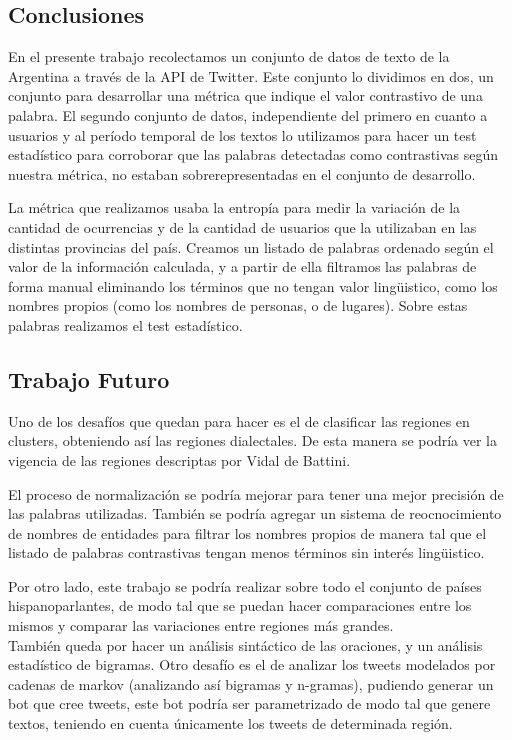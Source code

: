 
\subsection{Conclusiones}
En el presente trabajo recolectamos un conjunto de datos de texto de la Argentina a través de la API de Twitter. Este conjunto lo dividimos en dos, un conjunto para desarrollar una métrica que indique el valor contrastivo de una palabra. El segundo conjunto de datos, independiente del primero en cuanto a usuarios y al período temporal de los textos lo utilizamos para hacer un test estadístico para corroborar que las palabras detectadas como contrastivas según nuestra métrica, no estaban sobrerepresentadas en el conjunto de desarrollo.

La métrica que realizamos usaba la entropía para medir la variación de la cantidad de ocurrencias y de la cantidad de usuarios que la utilizaban en las distintas provincias del país. Creamos un listado de palabras ordenado según el valor de la información calculada, y a partir de ella filtramos las palabras de forma manual eliminando los términos que no tengan valor lingüistico, como los nombres propios (como los nombres de personas, o de lugares). Sobre estas palabras realizamos el test estadístico. 

\subsection{Trabajo Futuro}

Uno de los desafíos que quedan para hacer es el de clasificar las regiones en clusters, obteniendo así las regiones dialectales. De esta manera se podría ver la vigencia de las regiones descriptas por Vidal de Battini. %

El proceso de normalización se podría mejorar para tener una mejor precisión de las palabras utilizadas. También se podría agregar un sistema de reocnocimiento de nombres de entidades para filtrar los nombres propios de manera tal que el listado de palabras contrastivas tengan menos términos sin interés lingüistico.

Por otro lado, este trabajo se podría realizar sobre todo el conjunto de países hispanoparlantes, de modo tal que se puedan hacer comparaciones entre los mismos y comparar las variaciones entre regiones más grandes.\\

También queda por hacer un análisis sintáctico de las oraciones, y un análisis estadístico de bigramas.
Otro desafío es el de analizar los tweets modelados por cadenas de markov (analizando así bigramas y n-gramas), pudiendo generar un bot que cree tweets, este bot podría ser parametrizado de modo tal que genere textos, teniendo en cuenta únicamente los tweets de determinada región.

